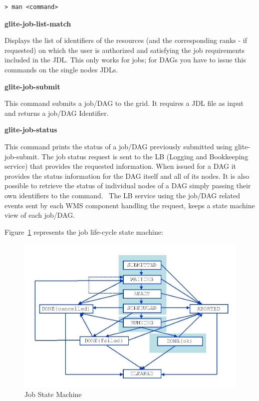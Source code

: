 \begin{scriptsize}
\begin{verbatim}
> man <command>
\end{verbatim}
\end{scriptsize}


\smallskip

\textbf{glite-job-list-match}

Displays the list of identifiers of the resources (and the corresponding ranks - if requested) on which the user 
is authorized and satisfying the job requirements included in the JDL. This only works for jobs; for DAGs you have to 
issue this commands on the single nodes JDLs. 

\textbf{glite-job-submit}

This command submits a job/DAG to the grid. It requires a JDL file as input and returns a job/DAG Identifier.

\textbf{glite-job-status}

This command prints the status of a job/DAG previously submitted using glite-job-submit. The job status request is sent 
to the LB (Logging and Bookkeeping service) that provides the requested information. 
When issued for a DAG it provides the status information for the DAG itself and all of its nodes. 
It is also possible to retrieve the status of individual nodes of a DAG simply passing their own identifiers to the 
command. \
The LB service  using the job/DAG related events sent by each WMS component handling the request, keeps a state machine 
view of each job/DAG. 

Figure~\ref{job-state} represents the job life-cycle state machine: 

\clearpage

\begin{figure}[htb]
\centering
\includegraphics[width=.8\hsize]{job-state-diagram}
\caption{Job State Machine}
\label{job-state}
\end{figure}

